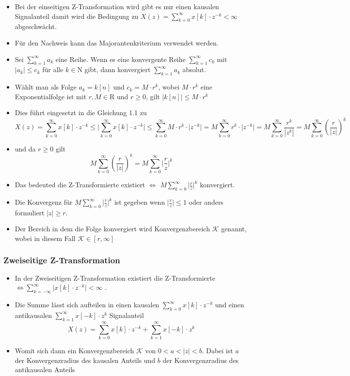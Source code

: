 \documentclass[11pt]{article}
\def\lt{<}
\begin{document}
\begin{itemize}
\item
  Bei der einseitigen Z-Transformation wird gibt es nur einen kausalen
  Signalanteil damit wird die Bedingung zu
  \(X(z) = \sum_{k=0}^\infty x[k] \cdot z^{-k} < \infty\) abgeschwächt.
\item
  Für den Nachweis kann das Majorantenkriterium verwendet werden.
\item
  Sei \(\sum_{k=1}^\infty a_k\) eine Reihe. Wenn es eine konvergente
  Reihe \(\sum_{k=1}^\infty c_k\) mit \(\big|a_k\big| \leqslant c_k\)
  für alle \(k \in \mathrm{N}\) gibt, dann konvergiert
  \(\sum_{k=1}^\infty a_k\) absolut.
\item
  Wählt man als Folge \(a_k = k[n]\) und \(c_k = M \cdot r^k\), wobei
  \(M \cdot r^k\) eine Exponentialfolge ist mit \(r, M \in \mathrm{R}\)
  und \(r \geq 0\), gilt \(\big|k[n]\big| \leqslant M \cdot r^k\)
\item
  Dies führt eingesetzt in die Gleichung 1.1 zu
  \[X(z) = \sum_{k=0}^\infty x[k] \cdot z^{-k} \leqslant \big| \sum_{k=0}^\infty x[k] \cdot z^{-k} \big| \leqslant \sum_{k=0}^\infty M \cdot r^k \cdot \big| z^{-k} \big| = M \sum_{k=0}^\infty r^k \cdot \big| z^{-k} \big| =  M \sum_{k=0}^\infty \frac {r^k}  {|z^{k}|} = M \sum_{k=0}^\infty (\frac {r}  {|z|})^k\]
\item
  und da \(r \geq 0\) gilt
  \[M \sum_{k=0}^\infty (\frac {r}  {|z|})^k = M \sum_{k=0}^\infty \big|\frac {r}  {z}\big|^k\]
\item
  Das bedeuted die Z-Transformierte existiert \(\iff\)
  \(M \sum_{k=0}^\infty \big|\frac {r} {z}\big|^k\) konvergiert.
\item
  Die Konvergenz für \(M \sum_{k=0}^\infty \big|\frac {r} {z}\big|^k\)
  ist gegeben wenn \(\big| \frac{r}{z} \big| \leq 1\) oder anders
  formuliert \(| z | \geq r\).
\item
  Der Bereich in dem die Folge konvergiert wird Konvergenzbereich
  \(\mathcal{K}\) genannt, wobei in diesem Fall
  \(\mathcal{K} \in [r,\infty]\)
\end{itemize}

\subsubsection{Zweiseitige
Z-Transformation}\label{zweiseitige-z-transformation}

\begin{itemize}
\item
  In der Zweiseitigen Z-Transformation existiert die Z-Transformierte
  \(\iff \sum_{k=-\infty}^\infty \big|x[k]\cdot z^{-k}\big| \lt \infty\)
  .
\item
  Die Summe lässt sich aufteilen in einen kausalen
  \(\sum_{k=0}^\infty x[k]\cdot z^{-k}\) und einen antikausalen
  \(\sum_{k=1}^\infty x[-k]\cdot z^{k}\) Signalanteil
  \[X(z) = \sum_{k=0}^\infty x[k]\cdot z^{-k} +  \sum_{k=1}^\infty x[-k]\cdot z^{k} \]
\item
  Womit sich dann ein Konvergenzbereich \(\mathcal{K}\) von
  \(0 \lt a \lt |z| \lt b\). Dabei ist \(a\) der Konvergenzradius des
  kausalen Anteils und \(b\) der Konvergenzradius des antikausalen
  Anteils
\end{itemize}
\end{document}
